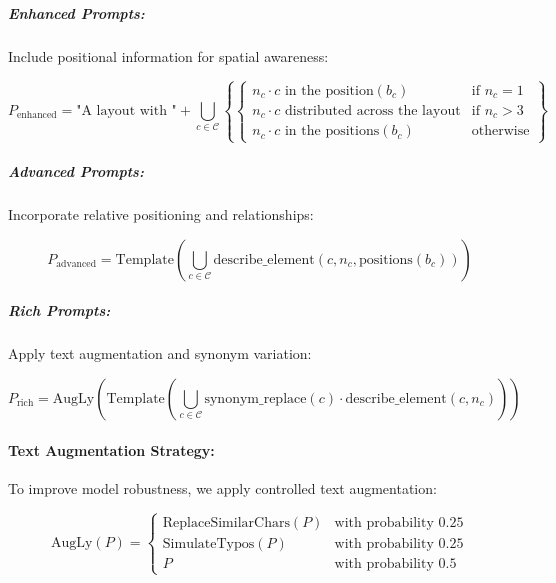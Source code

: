 \documentclass[journal,article,submit,pdftex,moreauthors]{Definitions/mdpi}
\begin{document}
\subparagraph{Enhanced Prompts:}
Include positional information for spatial awareness:
\begin{linenomath}
\begin{equation}
P_{\text{enhanced}} = \text{"A layout with "} + \bigcup_{c \in \mathcal{C}} \left\{ \begin{cases}
n_c \cdot c \text{ in the } \text{position}(b_c) & \text{if } n_c = 1\\
n_c \cdot c \text{ distributed across the layout} & \text{if } n_c > 3\\
n_c \cdot c \text{ in the } \text{positions}(b_c) & \text{otherwise}
\end{cases} \right\}
\end{equation}
\end{linenomath}

\subparagraph{Advanced Prompts:}
Incorporate relative positioning and relationships:
\begin{linenomath}
\begin{equation}
P_{\text{advanced}} = \text{Template} \left( \bigcup_{c \in \mathcal{C}} \text{describe\_element}(c, n_c, \text{positions}(b_c)) \right)
\end{equation}
\end{linenomath}

\subparagraph{Rich Prompts:}
Apply text augmentation and synonym variation:
\begin{linenomath}
\begin{equation}
P_{\text{rich}} = \text{AugLy} \left( \text{Template} \left( \bigcup_{c \in \mathcal{C}} \text{synonym\_replace}(c) \cdot \text{describe\_element}(c, n_c) \right) \right)
\end{equation}
\end{linenomath}

\paragraph{Text Augmentation Strategy:}

To improve model robustness, we apply controlled text augmentation:

\begin{linenomath}
\begin{equation}
\text{AugLy}(P) = \begin{cases}
\text{ReplaceSimilarChars}(P) & \text{with probability } 0.25\\
\text{SimulateTypos}(P) & \text{with probability } 0.25\\
P & \text{with probability } 0.5
\end{cases}
\end{equation}
\end{linenomath}
\end{document}
